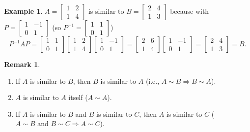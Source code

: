 \documentclass[12pt,letterpaper]{book}
\numberwithin{equation}{section}
\theoremstyle{definition}
\newtheorem{example}[thm]{\textbf{Example}}
\newtheorem{remark}[thm]{\textbf{Remark}}
\begin{document}
\begin{example} $A=\left[\begin{array}{rr} 1 & 2 \\ 1 & 4
\end{array}\right]$ is similar to $B=\left[\begin{array}{rr} 2 & 4 \\ 1 &
3 \end{array}\right]$ because with $P=\left[\begin{array}{rr} 1 & -1
\\ 0 & 1 \end{array}\right]$ (so $P^{-1}=\left[\begin{array}{rr} 1 &
1 \\ 0 & 1
\end{array}\right]$)
$$P^{-1}AP=\left[\begin{array}{rr} 1 & 1 \\ 0 & 1
\end{array}\right]\left[\begin{array}{rr} 1 & 2 \\ 1 & 4
\end{array}\right]\left[\begin{array}{rr} 1 &
-1 \\ 0 & 1 \end{array}\right]=\left[\begin{array}{rr} 2 & 6 \\ 1 &
4 \end{array}\right]\left[\begin{array}{rr} 1 & -1 \\ 0 & 1
\end{array}\right]=\left[\begin{array}{rr} 2 & 4 \\ 1 &
3 \end{array}\right]=B.$$
\end{example}

\begin{remark} \quad
\begin{enumerate}
\item If $A$ is similar to $B$, then $B$ is similar
to $A$ (i.e., $A\sim B \Longrightarrow B\sim A$).
\item $A$ is similar to $A$ itself ($A\sim A$).
\item If $A$ is similar to $B$ and $B$ is similar to $C$, then $A$ is
similar to $C$ ($A\sim B \text{ and } B\sim C \Longrightarrow
A\sim C$).
\end{enumerate}
\end{remark}
\end{document}
